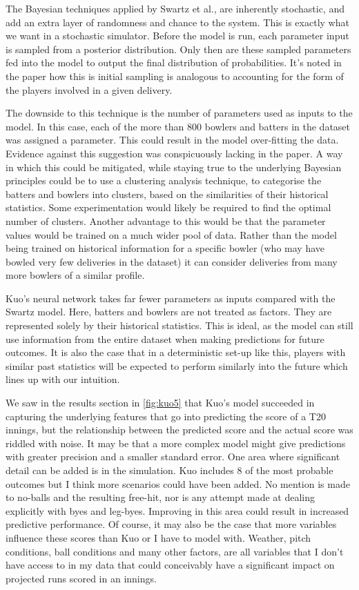 The Bayesian techniques applied by Swartz et al., are inherently stochastic, and add an extra layer of randomness and chance to the system. This is exactly what we want in a stochastic simulator. Before the model is run, each parameter input is sampled from a posterior distribution. Only then are these sampled parameters fed into the model to output the final distribution of probabilities. It’s noted in the paper how this is initial sampling is analogous to accounting for the form of the players involved in a given delivery.

The downside to this technique is the number of parameters used as inputs to the model. In this case, each of the more than 800 bowlers and batters in the dataset was assigned a parameter. This could result in the model over-fitting the data. Evidence against this suggestion was conspicuously lacking in the paper. A way in which this could be mitigated, while staying true to the underlying Bayesian principles could be to use a clustering analysis technique, to categorise the batters and bowlers into clusters, based on the similarities of their historical statistics. Some experimentation would likely be required to find the optimal number of clusters. Another advantage to this would be that the parameter values would be trained on a much wider pool of data. Rather than the model being trained on historical information for a specific bowler (who may have bowled very few deliveries in the dataset) it can consider deliveries from many more bowlers of a similar profile.

Kuo’s neural network takes far fewer parameters as inputs compared with the Swartz model. Here, batters and bowlers are not treated as factors. They are represented solely by their historical statistics. This is ideal, as the model can still use information from the entire dataset when making predictions for future outcomes. It is also the case that in a deterministic set-up like this, players with similar past statistics will be expected to perform similarly into the future which lines up with our intuition. 

We saw in the results section in \cref{fig:kuo5} that Kuo’s model succeeded in capturing the underlying features that go into predicting the score of a T20 innings, but the relationship between the predicted score and the actual score was riddled with noise. It may be that a more complex model might give predictions with greater precision and a smaller standard error. One area where significant detail can be added is in the simulation. Kuo includes 8 of the most probable outcomes but I think more scenarios could have been added. No mention is made to no-balls and the resulting free-hit, nor is any attempt made at dealing explicitly with byes and leg-byes. Improving in this area could result in increased predictive performance. Of course, it may also be the case that more variables influence these scores than Kuo or I have to model with. Weather, pitch conditions, ball conditions\footnotemark{} and many other factors, are all variables that I don’t have access to in my data that could conceivably have a significant impact on projected runs scored in an innings.

